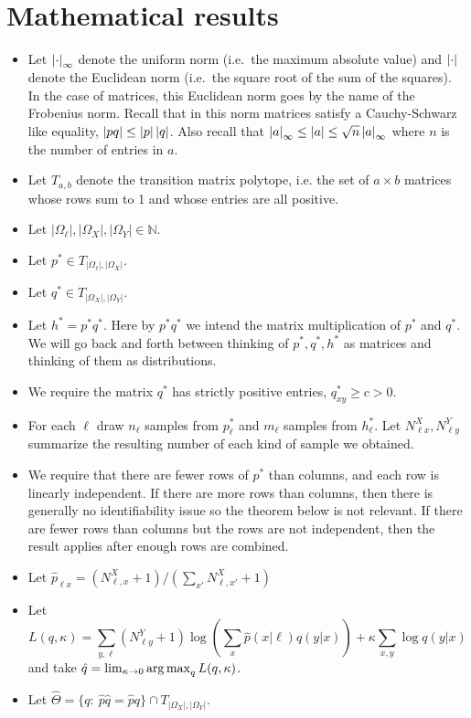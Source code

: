 


\appendix

\section{Mathematical results}

\label{sec:mainthm}

\begin{itemize}
\item Let $\left|\cdot\right|_\infty$ denote the uniform norm (i.e.\ the maximum absolute value) and $\left|\cdot\right|$ denote the Euclidean norm (i.e.\ the square root of the sum of the squares).  In the case of matrices, this Euclidean norm goes by the name of the Frobenius norm.  Recall that in this norm matrices satisfy a Cauchy-Schwarz like equality, $\left|pq\right|\leq\left|p\right|\left|q\right|$.  Also recall that $\left|a\right|_\infty \leq \left|a\right| \leq \sqrt{n}\left|a\right|_\infty$ where $n$ is the number of entries in $a$.
\item Let $T_{a,b}$ denote the transition matrix polytope, i.e. the set of $a\times b$ matrices whose rows sum to 1 and whose entries are all positive.
\item Let $|\Omega_\ell|,|\Omega_X|,|\Omega_Y| \in \mathbb{N}$.
\item Let $p^*\in T_{|\Omega_\ell|,|\Omega_X|}$.
\item Let $q^*\in T_{|\Omega_X|,|\Omega_Y|}$.
\item Let $h^*=p^*q^*$.  Here by $p^* q^*$ we intend the matrix multiplication of $p^*$ and $q^*$.  We will go back and forth between thinking of $p^*,q^*,h^*$ as matrices and thinking of them as distributions.
\item We require the matrix $q^*$ has strictly positive entries, $q^*_{xy}\geq c>0$.
\item For each $\ell$ draw $n_\ell$ samples from $p^*_\ell$ and $m_\ell$ samples from $h^*_\ell$.  Let $N^X_{\ell x},N^Y_{\ell y}$ summarize the resulting number of each kind of sample we obtained.
\item We require that there are fewer rows of $p^*$ than columns, and each row is linearly independent.  If there are more rows than columns, then there is generally no identifiability issue so the theorem below is not relevant.  If there are fewer rows than columns but the rows are not independent, then the result applies after enough rows are combined. 
\item Let $\hat p_{\ell x} = (N^{X}_{\ell,x}+1) / (\sum_{x'}N^{X}_{\ell,x'}+1)$
\item Let
\[
L(q,\kappa) = \sum_{y,\ell} (N^Y_{\ell y}+1) \log \left(\sum_x \hat p(x|\ell)q(y|x)\right)
    +\kappa\sum_{x,y} \log q(y|x)
\]
and take $\hat q = \lim_{\kappa\rightarrow 0} \operatorname*{arg\,max}_q L(q,\kappa)$.
\item Let $\hat \Theta=\{q:\ \hat p\hat q=\hat pq\} \cap T_{|\Omega_X|,|\Omega_Y|}$.
\end{itemize}
\vspace{.1in}


